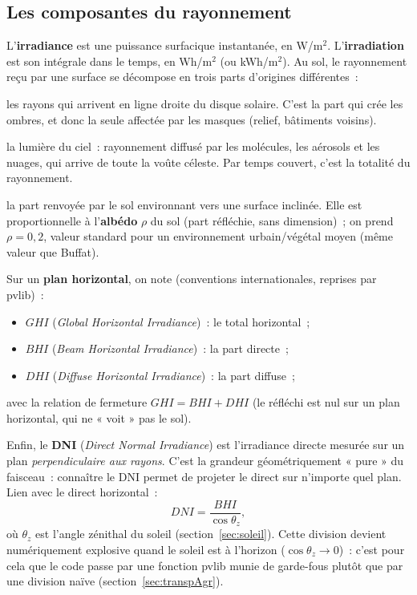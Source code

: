 \documentclass[11pt,a4paper]{article}
\begin{document}
\subsection{Les composantes du rayonnement}
\label{sec:composantes}

L'\textbf{irradiance} est une puissance surfacique instantanée, en W/m$^2$.
L'\textbf{irradiation} est son intégrale dans le temps, en Wh/m$^2$ (ou
kWh/m$^2$). Au sol, le rayonnement reçu par une surface se décompose en trois
parts d'origines différentes~:

\begin{description}[style=nextline]
  \item[Direct (\emph{beam})] les rayons qui arrivent en ligne droite du disque
    solaire. C'est la part qui crée les ombres, et donc la seule affectée par
    les masques (relief, bâtiments voisins).
  \item[Diffus] la lumière du ciel~: rayonnement diffusé par les molécules, les
    aérosols et les nuages, qui arrive de toute la voûte céleste. Par temps
    couvert, c'est la totalité du rayonnement.
  \item[Réfléchi] la part renvoyée par le sol environnant vers une surface
    inclinée. Elle est proportionnelle à l'\textbf{albédo} $\rho$ du sol (part
    réfléchie, sans dimension)~; on prend $\rho = 0{,}2$, valeur standard pour
    un environnement urbain/végétal moyen (même valeur que Buffat).
\end{description}

Sur un \textbf{plan horizontal}, on note (conventions internationales,
reprises par pvlib)~:
\begin{itemize}
  \item $GHI$ (\emph{Global Horizontal Irradiance})~: le total horizontal~;
  \item $BHI$ (\emph{Beam Horizontal Irradiance})~: la part directe~;
  \item $DHI$ (\emph{Diffuse Horizontal Irradiance})~: la part diffuse~;
\end{itemize}
avec la relation de fermeture $GHI = BHI + DHI$ (le réfléchi est nul sur un plan
horizontal, qui ne « voit » pas le sol).

Enfin, le \textbf{DNI} (\emph{Direct Normal Irradiance}) est l'irradiance
directe mesurée sur un plan \emph{perpendiculaire aux rayons}. C'est la grandeur
géométriquement « pure » du faisceau~: connaître le DNI permet de projeter le
direct sur n'importe quel plan. Lien avec le direct horizontal~:
\begin{equation}
  DNI = \frac{BHI}{\cos \theta_z},
  \label{eq:dni}
\end{equation}
où $\theta_z$ est l'angle zénithal du soleil (section~\ref{sec:soleil}).
Cette division devient numériquement explosive quand le soleil est à
l'horizon ($\cos\theta_z \to 0$)~: c'est pour cela que le code passe par une
fonction pvlib munie de garde-fous plutôt que par une division naïve
(section~\ref{sec:transpAgr}).
\end{document}
